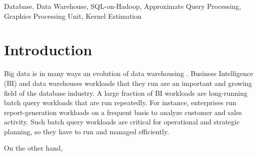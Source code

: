 \documentclass[conference]{IEEEtran}
\begin{document}
\begin{IEEEkeywords}
Database, Data Warehouse, SQL-on-Hadoop, Approximate Query Processing, Graphics Processing Unit, Kernel Estimation
\end{IEEEkeywords}

\section{Introduction}
\label{sc:Introduction}
Big data is in many ways an evolution of data warehousing \cite{Zaharia:2010}.
Business Intelligence (BI) and data warehouses workloads that they run are an important and growing field of the database industry.
A large fraction of BI workloads are long-running batch query workloads that are run repeatedly.
For instance, enterprises run report-generation workloads on a frequent basis to analyze customer and sales activity.
Such batch query workloads are critical for operational and strategic planning, so they have to run and managed efficiently.

On the other hand, 
\end{document}
